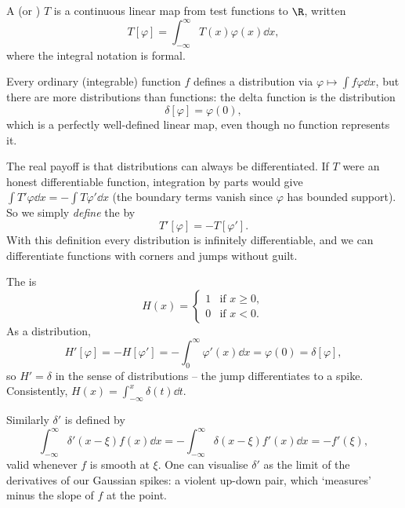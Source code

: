 \begin{definition}[Distribution]
    A  (or ) $T$ is a continuous linear map from test functions to $\R$, written
    $$
    T[\varphi] = \int_{-\infty}^{\infty} T(x) \varphi(x) \dd x,
    $$
    where the integral notation is formal.
\end{definition}

Every ordinary (integrable) function $f$ defines a distribution via $\varphi \mapsto \int f \varphi \dd x$, but there are more distributions than functions: the delta function is the distribution
$$
\delta[\varphi] = \varphi(0),
$$
which is a perfectly well-defined linear map, even though no function represents it.

The real payoff is that distributions can always be differentiated. If $T$ were an honest differentiable function, integration by parts would give $\int T' \varphi \dd x = -\int T \varphi' \dd x$ (the boundary terms vanish since $\varphi$ has bounded support). So we simply \emph{define} the  by
$$
T'[\varphi] = -T[\varphi'].
$$
With this definition every distribution is infinitely differentiable, and we can differentiate functions with corners and jumps without guilt.

\begin{example}
    The  is
    $$
    H(x) = \begin{cases}
        1 &\mbox{if } x \geq 0, \\
        0 &\mbox{if } x < 0.
    \end{cases}
    $$
    As a distribution,
    $$
    H'[\varphi] = -H[\varphi'] = -\int_0^{\infty} \varphi'(x) \dd x = \varphi(0) = \delta[\varphi],
    $$
    so $H' = \delta$ in the sense of distributions -- the jump differentiates to a spike. Consistently, $H(x) = \int_{-\infty}^x \delta(t) \dd t$.
\end{example}

\begin{example}
    Similarly $\delta'$ is defined by
    $$
    \int_{-\infty}^{\infty} \delta'(x - \xi) f(x) \dd x = -\int_{-\infty}^{\infty} \delta(x - \xi) f'(x) \dd x = -f'(\xi),
    $$
    valid whenever $f$ is smooth at $\xi$. One can visualise $\delta'$ as the limit of the derivatives of our Gaussian spikes: a violent up-down pair, which `measures' minus the slope of $f$ at the point.
\end{example}

